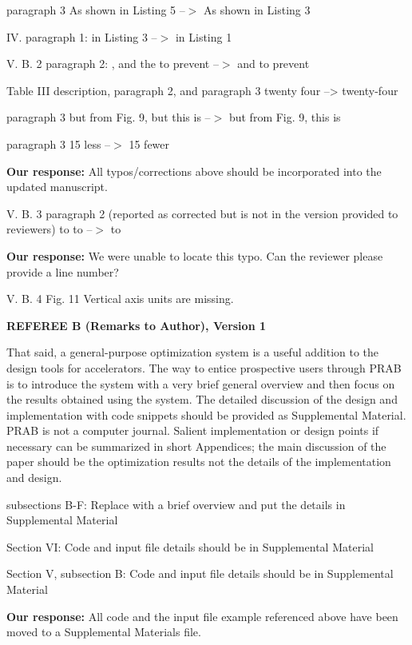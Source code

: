 \documentclass{article}
\begin{document}
paragraph 3
As shown in Listing 5 --$>$ As shown in Listing 3

IV. paragraph 1:
in Listing 3 --$>$ in Listing 1

V. B. 2 paragraph 2:
, and the to prevent --$>$ and to prevent

Table III description, paragraph 2, and paragraph 3
twenty four --> twenty-four

paragraph 3
but from Fig. 9, but this is --$>$ but from Fig. 9, this is

paragraph 3
15 less --$>$ 15 fewer

{\bf Our response:} {\color{blue} All typos/corrections above should be incorporated into the updated manuscript.}

V. B. 3
paragraph 2 (reported as corrected but is not in the version provided
to reviewers)
to to --$>$ to

{\bf Our response:} {\color{blue} 
	We were unable to locate this typo. Can the reviewer please provide a line number?}

V. B. 4
Fig. 11 Vertical axis units are missing.

{\bf REFEREE B (Remarks to Author), Version 1}

\vspace{1em}
That said, a general-purpose optimization system is a useful addition
to the design tools for accelerators. The way to entice prospective
users through PRAB is to introduce the system with a very brief
general overview and then focus on the results obtained using the
system. The detailed discussion of the design and implementation with
code snippets should be provided as Supplemental Material. PRAB is not
a computer journal. Salient implementation or design points if
necessary can be summarized in short Appendices; the main discussion
of the paper should be the optimization results not the details of the
implementation and design. 

subsections B-F:
Replace with a brief overview and put the details in Supplemental
Material

Section VI: 
Code and input file details should be in Supplemental Material

Section V, subsection B:
Code and input file details should be in Supplemental Material

{\bf Our response: } {\color{blue} All code and the input file example referenced above have been moved 
					to a Supplemental Materials file.}



 
\end{document}
